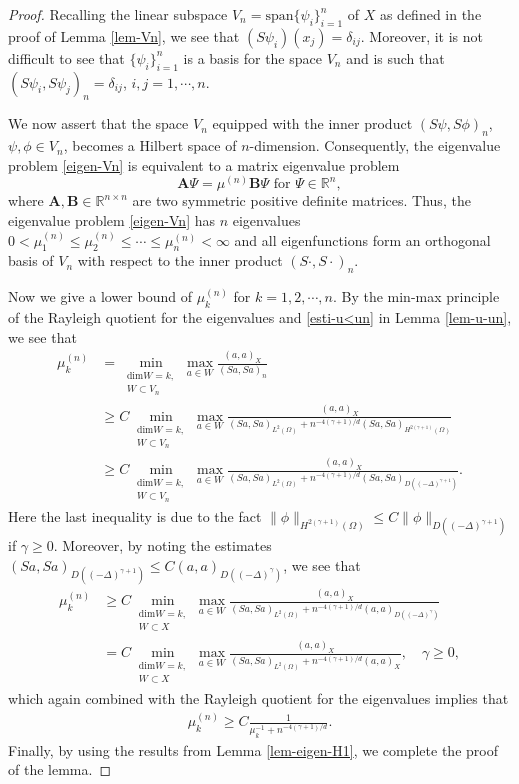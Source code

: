 \documentclass[11pt]{article}
\numberwithin{equation}{section}
\begin{document}
\begin{proof}
Recalling the linear subspace $V_n = \text{span} \{ \psi_i \}_{i=1}^n $ of $X$ as defined in the proof of Lemma \ref{lem-Vn}, we see that $(S\psi_i)(x_j) = \delta_{ij} $. Moreover, it is not difficult to see that $\{\psi_i\}_{i=1}^n$ is a basis for the space $V_n$ and is such that $(S\psi_i,S\psi_j)_n = \delta_{ij}$, $i,j=1,\cdots,n$.

We now assert that the space $V_n$ equipped with the inner product $(S\psi,S\phi)_n$, $\psi,\phi\in V_n$, becomes a Hilbert space of $n$-dimension. Consequently, the eigenvalue problem \eqref{eigen-Vn} is equivalent to a matrix eigenvalue problem
$$
\mathbf{A} \Psi = \mu^{(n)}  \mathbf{B} \Psi  \text{ for }  \Psi \in \mathbb{R}^n ,
$$
where $ \mathbf{A}, \mathbf{B} \in \mathbb{R}^{n \times n} $ are two symmetric positive definite matrices. Thus, the eigenvalue problem \eqref{eigen-Vn} has $n$ eigenvalues $ 0<\mu_1^{(n)} \leq \mu_2^{(n)} \leq \cdots \leq \mu^{(n)} _n <\infty$ and all eigenfunctions form an orthogonal basis of $ V_n $ with respect to the inner product $(S \cdot,S \cdot)_n$.

Now we give a lower bound of $ \mu_k^{(n)}$ for $k=1,2,\cdots,n$. By the min-max principle of the Rayleigh quotient for the eigenvalues and \eqref{esti-u<un} in Lemma \ref{lem-u-un}, we see that
$$
\begin{aligned}
\mu_k^{(n)} &= \min_{\substack{\text{dim}W=k,\\ W\subset V_n}} \max_{a \in W} \frac{(a,a)_{X}}{(Sa,Sa)_n}
\\
&\geq C \min_{\substack{\text{dim}W=k,\\ W\subset V_n}} \max_{a \in W} \frac{(a,a)_{X}}{(Sa,Sa)_{L^2(\Omega)} + n^{- 4(\gamma+1)/d} (Sa,Sa)_{H^{2(\gamma+1)}(\Omega)}}
\\
&\geq C \min_{\substack{\text{dim}W=k,\\ W\subset V_n}} \max_{a \in W} \frac{(a,a)_{X}}{(Sa,Sa)_{L^2(\Omega)} + n^{- 4(\gamma+1)/d} (Sa,Sa)_{D((-\Delta)^{\gamma+1})}}.
\end{aligned}
$$
Here the last inequality is due to the fact $\|\phi\|_{H^{2(\gamma+1)}(\Omega)} \le C\|\phi\|_{D((-\Delta)^{\gamma+1})}$ if $\gamma\ge0$. Moreover, by noting the estimates $(Sa,Sa)_{D((-\Delta)^{\gamma+1})}\leq C(a,a)_{D((-\Delta)^{\gamma})}$, we see that
$$
\begin{aligned}
\mu_k^{(n)}
&\geq C \min_{\substack{\text{dim}W=k,\\ W\subset X}} \max_{a \in W} \frac{(a,a)_{X}}{(Sa,Sa)_{L^2(\Omega)} + n^{- 4(\gamma+1)/d} (a,a)_{D((-\Delta)^\gamma)}}
\\
&= C \min_{\substack{\text{dim}W=k,\\ W\subset X}} \max_{a \in W} \frac{(a,a)_{X}}{(Sa,Sa)_{L^2(\Omega)} + n^{- 4(\gamma+1)/d} (a,a)_X},\quad \gamma\ge0,
\end{aligned}
$$
which again combined with the Rayleigh quotient for the eigenvalues implies that
$$
\begin{aligned}
\mu_k^{(n)}
\geq C  \frac{1}{\mu_k^{-1} + n^{- 4(\gamma+1)/d}}.
\end{aligned}
$$
Finally, by using the results from Lemma \ref{lem-eigen-H1}, we complete the proof of the lemma.
\end{proof}
\end{document}
